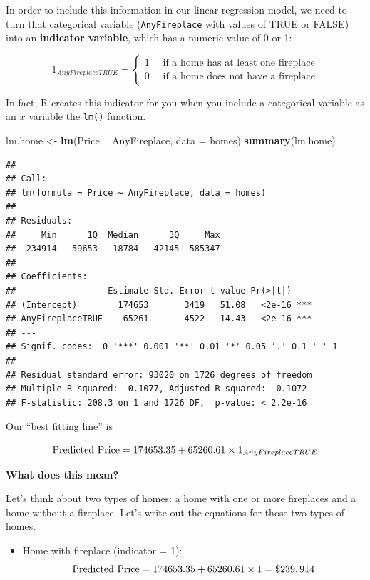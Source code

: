 \documentclass[]{book}
\newenvironment{Shaded}{\begin{snugshade}}{\end{snugshade}}
\newcommand{\DataTypeTok}[1]{\textcolor[rgb]{0.13,0.29,0.53}{#1}}
\newcommand{\KeywordTok}[1]{\textcolor[rgb]{0.13,0.29,0.53}{\textbf{#1}}}
\newcommand{\NormalTok}[1]{#1}
\newcommand{\OperatorTok}[1]{\textcolor[rgb]{0.81,0.36,0.00}{\textbf{#1}}}
\newcommand{\StringTok}[1]{\textcolor[rgb]{0.31,0.60,0.02}{#1}}
\providecommand{\tightlist}{%
  \setlength{\itemsep}{0pt}\setlength{\parskip}{0pt}}
\begin{document}
In order to include this information in our linear regression model, we need to turn that categorical variable (\texttt{AnyFireplace} with values of TRUE or FALSE) into an \textbf{indicator variable}, which has a numeric value of 0 or 1:

\[ 1_{AnyFireplaceTRUE} = \begin{cases}1 \quad \text{ if a home has at least one fireplace}\\ 0\quad \text{ if a home does not have a fireplace} \end{cases}\]

In fact, R creates this indicator for you when you include a categorical variable as an \(x\) variable the \texttt{lm()} function.

\begin{Shaded}
\begin{Highlighting}[]
\NormalTok{lm.home <-}\StringTok{ }\KeywordTok{lm}\NormalTok{(Price }\OperatorTok{~}\StringTok{ }\NormalTok{AnyFireplace, }\DataTypeTok{data =}\NormalTok{ homes)}
\KeywordTok{summary}\NormalTok{(lm.home)}
\end{Highlighting}
\end{Shaded}

\begin{verbatim}
## 
## Call:
## lm(formula = Price ~ AnyFireplace, data = homes)
## 
## Residuals:
##     Min      1Q  Median      3Q     Max 
## -234914  -59653  -18784   42145  585347 
## 
## Coefficients:
##                  Estimate Std. Error t value Pr(>|t|)    
## (Intercept)        174653       3419   51.08   <2e-16 ***
## AnyFireplaceTRUE    65261       4522   14.43   <2e-16 ***
## ---
## Signif. codes:  0 '***' 0.001 '**' 0.01 '*' 0.05 '.' 0.1 ' ' 1
## 
## Residual standard error: 93020 on 1726 degrees of freedom
## Multiple R-squared:  0.1077, Adjusted R-squared:  0.1072 
## F-statistic: 208.3 on 1 and 1726 DF,  p-value: < 2.2e-16
\end{verbatim}

Our ``best fitting line'' is

\[ \hbox{Predicted Price} = 174653.35 + 65260.61 \times 1_{AnyFireplaceTRUE} \]

\textbf{What does this mean?}

Let's think about two types of homes: a home with one or more fireplaces and a home without a fireplace. Let's write out the equations for those two types of homes.

\begin{itemize}
\tightlist
\item
  Home with fireplace (indicator = 1):\\
  \[ \hbox{Predicted Price} = 174653.35 + 65260.61 \times 1 = \$ 239,914 \]
\end{itemize}
\end{document}

